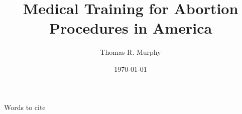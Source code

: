 \documentclass[letterpaper, 12pt]{article}
\title{Medical Training for Abortion Procedures in America}
\author{Thomas R. Murphy}
\date{\today}
\begin{document}
\maketitle

	Words to cite \autocite[pg. N]{turk_availability_2014}

\newpage

\printbibliography
\end{document}
